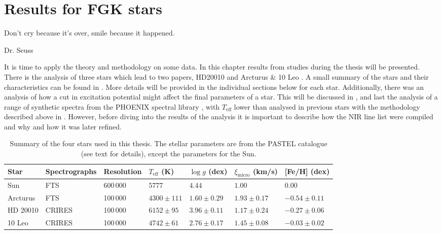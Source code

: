 \chapter{Results for FGK stars}
\label{cha:results}
\epigraph{Don't cry because it's over, smile because it happened.}{Dr. Seuss}

It is time to apply the theory and methodology on some data. In this chapter results from studies
during the thesis will be presented. There is the analysis of three stars which lead to two papers,
HD20010 \citep{Andreasen2016} and Arcturus \& 10 Leo \citep{Andreasen2017b}. A small summary of the
stars and their characteristics can be found in . More details will be provided in
the individual sections below for each star. Additionally, there was an analysis of how a cut in
excitation potential might affect the final parameters of a star. This will be discussed in
, and last the analysis of a range of synthetic spectra from the PHOENIX spectral
library \citep{Husser2013}, with $T_\mathrm{eff}$ lower than analysed in previous stars with the
methodology described above in . However, before diving into the results of the
analysis it is important to describe how the NIR line list were compiled and why and how it was
later refined.

\begin{table}[htb!]
    \caption{Summary of the four stars used in this thesis. The stellar parameters
             are from the PASTEL catalogue \citep{Soubiran2016} (see text for
             details), except the parameters for the Sun.}
    \label{tab:stars}
    \centering
    \begin{tabular}{lllllll}
      \hline\hline
        Star        & Spectrographs  & Resolution  & $T_\mathrm{eff}$ (K) &  $\log g$ (dex)  &   $\xi_\mathrm{micro}$ (km/s)   & [Fe/H] (dex)      \\
      \hline
        Sun         & FTS            & 600\,000    & $5777$               &  $4.44$          &    $1.00$                       & $ 0.00$          \\
        Arcturus    & FTS            & 100\,000    & $4300 \pm 111$       &  $1.60 \pm 0.29$ &    $1.93 \pm 0.17$              & $-0.54 \pm 0.11$ \\
        HD 20010    & CRIRES         & 100\,000    & $6152 \pm  95$       &  $3.96 \pm 0.11$ &    $1.17 \pm 0.24$              & $-0.27 \pm 0.06$ \\
        10 Leo      & CRIRES         & 100\,000    & $4742 \pm  61$       &  $2.76 \pm 0.17$ &    $1.45 \pm 0.08$              & $-0.03 \pm 0.02$ \\
      \hline
    \end{tabular}
\end{table}

